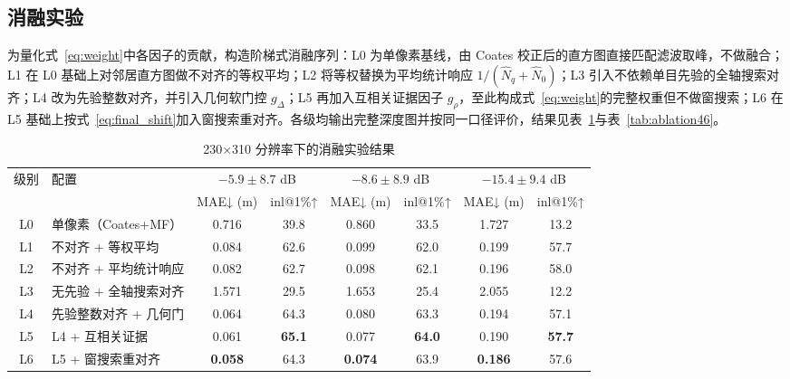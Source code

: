 \subsection{消融实验}
\label{sec:ablation}

为量化式~\eqref{eq:weight}中各因子的贡献，构造阶梯式消融序列：L0 为单像素基线，由 Coates 校正后的直方图直接匹配滤波取峰，不做融合；L1 在 L0 基础上对邻居直方图做不对齐的等权平均；L2 将等权替换为平均统计响应 $1/(\hat N_q+\hat N_0)$；L3 引入不依赖单目先验的全轴搜索对齐；L4 改为先验整数对齐，并引入几何软门控 $g_\Delta$；L5 再加入互相关证据因子 $g_\rho$，至此构成式~\eqref{eq:weight}的完整权重但不做窗搜索；L6 在 L5 基础上按式~\eqref{eq:final_shift}加入窗搜索重对齐。各级均输出完整深度图并按同一口径评价，结果见表~\ref{tab:ablation230}与表~\ref{tab:ablation46}。

\begin{table}[!t]
\centering
\caption{230×310 分辨率下的消融实验结果}
\label{tab:ablation230}\small\setlength{\tabcolsep}{8pt}
\begin{tabular}{clcccccc}
\toprule
\multirow{2}{*}{级别} & \multirow{2}{*}{配置} & \multicolumn{2}{c}{$-5.9\pm8.7$ dB} & \multicolumn{2}{c}{$-8.6\pm8.9$ dB} & \multicolumn{2}{c}{$-15.4\pm9.4$ dB} \\
\cmidrule(lr){3-4}\cmidrule(lr){5-6}\cmidrule(lr){7-8}
 & & MAE↓ (m) & inl@1\%↑ & MAE↓ (m) & inl@1\%↑ & MAE↓ (m) & inl@1\%↑ \\
\midrule
L0 & 单像素（Coates+MF） & 0.716 & 39.8 & 0.860 & 33.5 & 1.727 & 13.2 \\
L1 & 不对齐 + 等权平均 & 0.084 & 62.6 & 0.099 & 62.0 & 0.199 & 57.7 \\
L2 & 不对齐 + 平均统计响应 & 0.082 & 62.7 & 0.098 & 62.1 & 0.196 & 58.0 \\
L3 & 无先验 + 全轴搜索对齐 & 1.571 & 29.5 & 1.653 & 25.4 & 2.055 & 12.2 \\
L4 & 先验整数对齐 + 几何门 & 0.064 & 64.3 & 0.080 & 63.3 & 0.194 & 57.1 \\
L5 & L4 + 互相关证据 & 0.061 & \textbf{65.1} & 0.077 & \textbf{64.0} & 0.190 & \textbf{57.7} \\
L6 & L5 + 窗搜索重对齐 & \textbf{0.058} & 64.3 & \textbf{0.074} & 63.9 & \textbf{0.186} & 57.6 \\
\bottomrule
\end{tabular}
\end{table}

